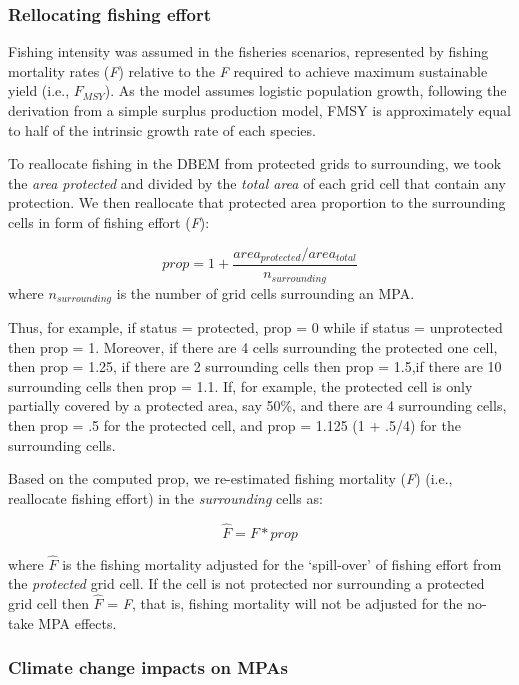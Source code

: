 \documentclass[
]{article}
\begin{document}
\hypertarget{rellocating-fishing-effort}{%
\subsubsection{Rellocating fishing effort}\label{rellocating-fishing-effort}}

Fishing intensity was assumed in the fisheries scenarios, represented by fishing mortality rates (\emph{F}) relative to the \emph{F} required to achieve maximum sustainable yield (i.e., \(F_{MSY}\)). As the model assumes logistic population growth, following the derivation from a simple surplus production model, FMSY is approximately equal to half of the intrinsic growth rate of each species.

To reallocate fishing in the DBEM from protected grids to surrounding, we took the \emph{area protected} and divided by the \emph{total area} of each grid cell that contain any protection. We then reallocate that protected area proportion to the surrounding cells in form of fishing effort (\emph{F}):

\[prop = 1 + \frac{area_{protected}/area_{total}}{n_{surrounding}}\]
where \(n_{surrounding}\) is the number of grid cells surrounding an MPA.

Thus, for example, if status = protected, prop = 0 while if status = unprotected then prop = 1. Moreover, if there are 4 cells surrounding the protected one cell, then prop = 1.25, if there are 2 surrounding cells then prop = 1.5,if there are 10 surrounding cells then prop = 1.1. If, for example, the protected cell is only partially covered by a protected area, say 50\%, and there are 4 surrounding cells, then prop = .5 for the protected cell, and prop = 1.125 (1 + .5/4) for the surrounding cells.

Based on the computed prop, we re-estimated fishing mortality (\emph{F}) (i.e., reallocate fishing effort) in the \emph{surrounding} cells as:

\[\hat{F}= F*prop\]

where \(\hat{F}\) is the fishing mortality adjusted for the `spill-over' of fishing effort from the \emph{protected} grid cell. If the cell is not protected nor surrounding a protected grid cell then \(\hat{F}\) = \emph{F}, that is, fishing mortality will not be adjusted for the no-take MPA effects.

\hypertarget{climate-change-impacts-on-mpas}{%
\subsubsection{Climate change impacts on MPAs}\label{climate-change-impacts-on-mpas}}
\end{document}
